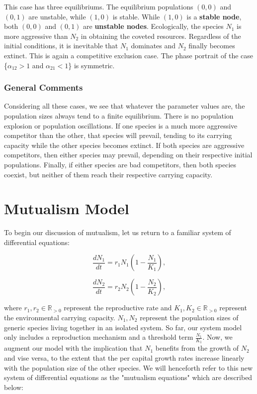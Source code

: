 \documentclass[11pt,a4paper]{scrartcl}
\theoremstyle{definition}
\begin{document}
This case has three equilibriums. The equilibrium populations $(0, 0)$ and $(0, 1)$ are unstable, while $(1, 0)$ is stable. While $(1, 0)$ is a \textbf{stable node}, both $(0, 0)$ and $(0, 1)$ are \textbf{unstable nodes}. Ecologically, the species $N_1$ is more aggressive than $N_2$ in obtaining the coveted resources. Regardless of the initial conditions, it is inevitable that $N_1$ dominates and $N_2$ finally becomes extinct. This is again a competitive exclusion case. The phase portrait of the case \Big\{$\alpha_{12} > 1$ and $\alpha_{21} < 1$\Big\} is symmetric.
\FloatBarrier

\subsubsection{General Comments}

Considering all these cases, we see that whatever the parameter values are, the population sizes always tend to a finite equilibrium. There is no population explosion or population oscillations. If one species is a much more aggressive competitor than the other, that species will prevail, tending to its carrying capacity while the other species becomes extinct. If both species are aggressive competitors, then either species may prevail, depending on their respective initial populations. Finally, if either species are bad competitors, then both species coexist, but neither of them reach their respective carrying capacity.


\section{Mutualism Model}

To begin our discussion of mutualism, let us return to a familiar system of differential equations: 

\begin{equation} \tag{11}
	\frac{dN_1}{dt}=r_1N_1(1-\frac{N_1}{K_1}),
\end{equation}

\begin{equation} \tag{12}
	\frac{dN_2}{dt}=r_2N_2(1-\frac{N_2}{K_2}),
\end{equation}

where $r_1, r_2 \in \mathbb{R}_{>0}$ represent the reproductive rate and $K_1, K_2 \in \mathbb{R}_{>0}$ represent the environmental carrying capacity. $N_1, N_2$ represent the population sizes of generic species living together in an isolated system. So far, our system model only includes a reproduction mechanism and a threshold term $\frac{N_1}{K_1}$. Now, we augment our model with the implication that $N_1$ benefits from the growth of $N_2$ and vise versa, to the extent that the per capital growth rates increase linearly with the population size of the other species. We will henceforth refer to this new system of differential equations as the "mutualism equations" which are described below:
\end{document}
